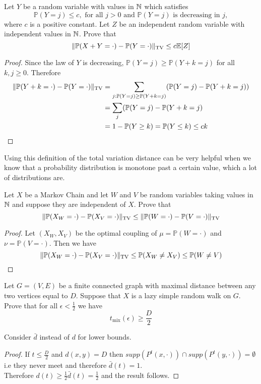 \documentclass[a4paper]{article}
\renewcommand{\P}{\mathbb P}
\newcommand{\tv}{\text{TV}}
\newcommand{\tmix}{t_{\text{mix}}}
\begin{document}
\begin{question}[Question 4]
  Let $Y$ be a random variable with values in $\N$ which satisfies
  \[\P(Y = j) \leq c,\text{ for all } j > 0 \text{ and } \P(Y = j) \text{ is
      decreasing in } j,\]
  where $c$ is a positive constant. Let $Z$ be an independent random variable with
  independent values in $\N$. Prove that
  \[\norm{\P(X+Y = \cdot) - \P(Y = \cdot)}_\tv \leq c\E[Z]\]
\end{question}
\begin{proof}
  Since the law of $Y$ is decreasing, $\P(Y = j) \geq \P(Y + k = j)$ for all $k,
  j \geq 0$. Therefore
  \begin{align*}
    \norm{\P(Y+k = \cdot) - \P(Y = \cdot )}_\tv &= \sum_{j: \P(Y = j) \geq \P(Y+k
                                                  = j)}(\P(Y = j) - \P(Y+k = j))\\
                                                &= \sum_j (\P(Y = j) - \P(Y+k = j)\\
    &= 1 - \P(Y \geq k) = \P(Y \leq k) \leq ck
    \end{align*}
\end{proof}
\begin{remark}
  Using this definition of the total variation distance can be very helpful when
  we know that a probability distribution is monotone past a certain value,
  which a lot of distributions are.
\end{remark}

\begin{question}[Question 5]
  Let $X$ be a Markov Chain and let $W$ and $V$ be random variables taking
  values in $\N$ and suppose they are independent of $X$. Prove that
  \[\norm{\P(X_W = \cdot) - \P(X_V = \cdot)}_\tv \leq \norm{\P(W = \cdot) - \P(V
      = \cdot)}_\tv\]
\end{question}
\begin{proof}
  Let $(X_W, X_V)$ be the optimal coupling of $\mu = \P (W = \cdot)$ and $\nu =
  \P( V = \cdot )$. Then we have
  \[\norm{\P (X_W = \cdot ) - \P ( X_V = \cdot )}_\tv \leq \P (X_W \neq X_V)
    \leq \P (W \neq V)\]
\end{proof}

\begin{question}[Question 6]
  Let $G = (V, E)$ be a finite connected graph with maximal distance between any
  two vertices equal to $D$. Suppose that $X$ is a lazy simple random walk on
  $G$. Prove that for all $\epsilon < \frac{1}{2}$ we have
  \[\tmix(\epsilon) \geq \frac{D}{2}\]
\end{question}
\begin{idea}
  Consider $\bar{d}$ instead of $d$ for lower bounds.
\end{idea}
\begin{proof}
  If $t \leq \frac{D}{2}$ and $d(x,y) = D$ then $supp(P^t(x, \cdot)) \cap
  supp(P^t(y, \cdot )) = \emptyset $ i.e they never meet and therefore
  $\bar{d}(t) = 1$.\\
  Therefore $d(t) \geq \frac{1}{2}\bar{d}(t) = \frac{1}{2}$ and the result follows.
\end{proof}
\end{document}

